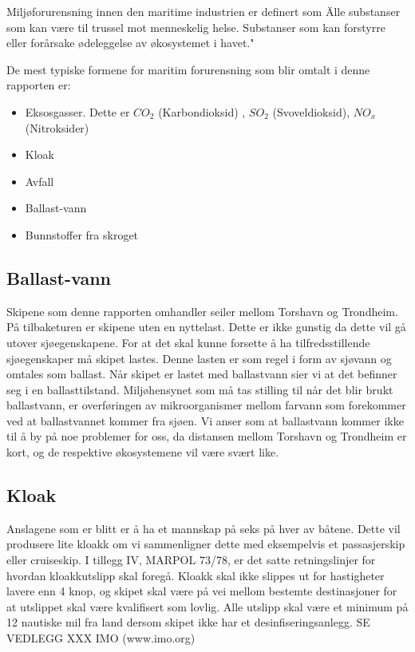 \documentclass[norsk]{article}
\begin{document}
Miljøforurensning innen den maritime industrien er definert som \"Alle substanser som kan være til trussel mot menneskelig helse. Substanser som kan forstyrre eller forårsake ødeleggelse av økosystemet i havet."\

De mest typiske formene for maritim forurensning som blir omtalt i denne rapporten er:

\begin{itemize}
\item Eksosgasser. Dette er $CO_2$ (Karbondioksid) , $SO_2$ (Svoveldioksid), $NO_x$ (Nitroksider) 
\item Kloak 
\item Avfall 
\item Ballast-vann
\item Bunnstoffer fra skroget
\end{itemize}

	\subsection{Ballast-vann}
Skipene som denne rapporten omhandler seiler mellom Torshavn og Trondheim. På tilbaketuren er skipene uten en nyttelast. Dette er ikke gunstig da dette vil gå utover sjøegenskapene. For at det skal kunne forsette å ha tilfredsstillende sjøegenskaper må skipet lastes. Denne lasten er som regel i form av sjøvann og omtales som ballast. Når skipet er lastet med ballastvann sier vi at det befinner seg i en ballasttilstand. Miljøhensynet som må tas stilling til når det blir brukt ballastvann, er overføringen av mikroorganismer mellom farvann som forekommer ved at ballastvannet kommer fra sjøen.
Vi anser som at ballastvann kommer ikke til å by på noe problemer for oss, da distansen mellom Torshavn og Trondheim er kort, og de respektive økosystemene vil være svært like.

 
	\subsection{Kloak}
Anslagene som er blitt er å ha et mannskap på seks på hver av båtene. Dette vil produsere lite kloakk om vi sammenligner dette med eksempelvis et passasjerskip eller cruiseskip. I tillegg IV, MARPOL 73/78, er det satte retningslinjer for hvordan kloakkutslipp skal foregå. Kloakk skal ikke slippes ut for hastigheter lavere enn 4 knop, og skipet skal være på vei mellom bestemte destinasjoner for at utslippet skal være kvalifisert som lovlig. Alle utslipp skal være et minimum på 12 nautiske mil fra land dersom skipet ikke har et desinfiseringsanlegg. SE VEDLEGG XXX IMO (www.imo.org) 
\end{document}
